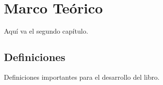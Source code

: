 \chapter{Marco Teórico}
Aquí va el segundo capítulo.

\section{Definiciones}
Definiciones importantes para el desarrollo del libro.
